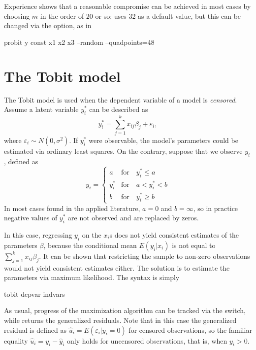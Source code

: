 Experience shows that a reasonable compromise can be achieved in most
cases by choosing $m$ in the order of 20 or so;  uses 32 as
a default value, but this can be changed via the 
option, as in
\begin{code}
  probit y const x1 x2 x3 --random --quadpoints=48
\end{code}

 
\section{The Tobit model}
\label{sec:tobit}

The Tobit model is used when the dependent variable of a model is
\emph{censored}. Assume a latent variable $y^*_i$ can be described
as
\[
  y^*_i = \sum_{j=1}^k x_{ij} \beta_j + \varepsilon_i ,
\]
where $\varepsilon_i \sim N(0,\sigma^2)$. If $y^*_i$ were observable,
the model's parameters could be estimated via ordinary least squares.
On the contrary, suppose that we observe $y_i$, defined as
%
\begin{equation}
  \label{eq:tobit}
  y_i = \left\{ 
    \begin{array}{ll}
      a & \mathrm{for} \quad y^*_i \le a \\
      y^*_i & \mathrm{for} \quad a < y^*_i < b \\ 
      b & \mathrm{for} \quad y^*_i \ge b 
    \end{array}
    \right. 
\end{equation}
In most cases found in the applied literature, $a=0$ and $b=\infty$,
so in practice negative values of $y^*_i$ are not observed and are
replaced by zeros.

In this case, regressing $y_i$ on the $x_i$s does not yield consistent
estimates of the parameters $\beta$, because the conditional mean
$E(y_i|x_i)$ is not equal to $\sum_{j=1}^k x_{ij} \beta_j$.  It can be
shown that restricting the sample to non-zero observations would not
yield consistent estimates either. The solution is to estimate the
parameters via maximum likelihood. The syntax is simply
\begin{code}
tobit depvar indvars
\end{code}

As usual, progress of the maximization algorithm can be tracked via
the  switch, while  returns the
generalized residuals. Note that in this case the generalized residual
is defined as $\hat{u}_i = E(\varepsilon_i | y_i = 0)$ for censored
observations, so the familiar equality $\hat{u}_i = y_i - \hat{y}_i$
only holds for uncensored observations, that is, when $y_i>0$.


